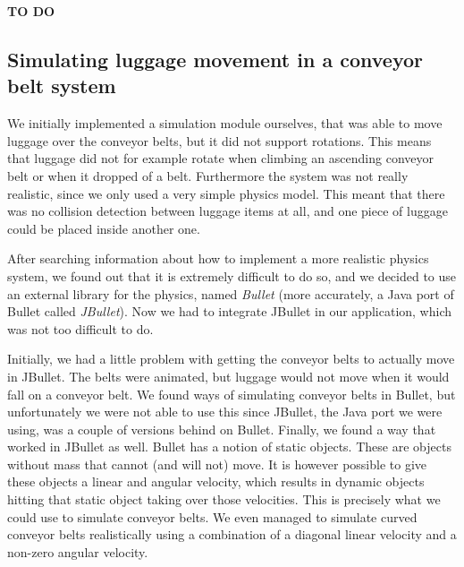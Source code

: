 \textbf{TO DO}

\subsection{Simulating luggage movement in a conveyor belt system}
We initially implemented a simulation module ourselves, that was able to move luggage over the conveyor belts, but it did not support rotations. This means that luggage did not for example rotate when climbing an ascending conveyor belt or when it dropped of a belt. Furthermore the system was not really realistic, since we only used a very simple physics model. This meant that there was no collision detection between luggage items at all, and one piece of luggage could be placed inside another one.

After searching information about how to implement a more realistic physics system, we found out that it is extremely difficult to do so, and we decided to use an external library for the physics, named \emph{Bullet} (more accurately, a Java port of Bullet called \emph{JBullet}). Now we had to integrate JBullet in our application, which was not too difficult to do.

Initially, we had a little problem with getting the conveyor belts to actually move in JBullet. The belts were animated, but luggage would not move when it would fall on a conveyor belt. We found ways of simulating conveyor belts in Bullet, but unfortunately we were not able to use this since JBullet, the Java port we were using, was a couple of versions behind on Bullet. Finally, we found a way that worked in JBullet as well. Bullet has a notion of static objects. These are objects without mass that cannot (and will not) move. It is however possible to give these objects a linear and angular velocity, which results in dynamic objects hitting that static object taking over those velocities. This is precisely what we could use to simulate conveyor belts. We even managed to simulate curved conveyor belts realistically using a combination of a diagonal linear velocity and a non-zero angular velocity.